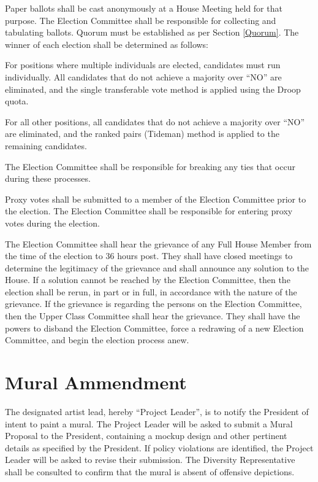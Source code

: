 \documentclass[10pt]{article} %
\begin{document}
Paper ballots shall be cast anonymously at a House Meeting held for that purpose. The Election Committee shall be responsible for collecting and tabulating ballots. Quorum must be established as per Section \ref{Quorum}. The winner of each election shall be determined as follows: 

\setlength{\leftskip}{5mm}
For positions where multiple individuals are elected, candidates must run individually. All candidates that do not achieve a majority over ``NO'' are eliminated, and the single transferable vote method is applied using the Droop quota.

For all other positions, all candidates that do not achieve a majority over ``NO'' are eliminated, and the ranked pairs (Tideman) method is applied to the remaining candidates.

\setlength{\leftskip}{0mm}
The Election Committee shall be responsible for breaking any ties that occur during these processes.

Proxy votes shall be submitted to a member of the Election Committee prior to the election. The Election Committee shall be responsible for entering proxy votes during the election.

The Election Committee shall hear the grievance of any Full House Member from the time of the election to 36 hours post. They shall have closed meetings to determine the legitimacy of the grievance and shall announce any solution to the House. If a solution cannot be reached by the Election Committee, then the election shall be rerun, in part or in full, in accordance with the nature of the grievance. If the grievance is regarding the persons on the Election Committee, then the Upper Class Committee shall hear the grievance. They shall have the powers to disband the Election Committee, force a redrawing of a new Election Committee, and begin the election process anew.

\section{Mural Ammendment}
The designated artist lead, hereby ``Project Leader'', is to notify the President of intent to paint a mural. The Project Leader will be asked to submit a Mural Proposal to the President, containing a mockup design and other pertinent details as specified by the President. If policy violations are identified, the Project Leader will be asked to revise their submission. The Diversity Representative shall be consulted to confirm that the mural is absent of offensive depictions.
        
\end{document}
